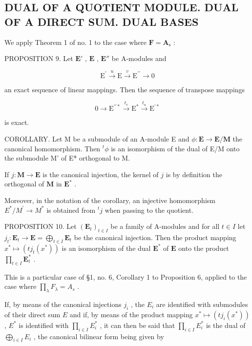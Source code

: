 \subsection{DUAL OF A QUOTIENT MODULE. DUAL OF A DIRECT SUM. DUAL BASES}

We apply Theorem 1 of no. 1 to the case where \(\mathbf{F} = \mathbf{A}_{\mathrm{s}}\) :

PROPOSITION 9. Let \(\mathbf{E}'\) , \(\mathbf{E}\) , \(\mathbf{E}''\) be A-modules and

\[
\mathrm{E} ^ {\prime} \stackrel {u} {\longrightarrow} \mathrm{E} \stackrel {v} {\longrightarrow} \mathrm{E} ^ {\prime \prime} \longrightarrow 0\tag{21}
\]

an exact sequence of linear mappings. Then the sequence of transpose mappings

\[
0 \longrightarrow \mathrm{E} ^ {\prime \prime *} \stackrel {t _ {v}} {\longrightarrow} \mathrm{E} ^ {*} \stackrel {t _ {u}} {\longrightarrow} \mathrm{E} ^ {\prime *} \tag {1}
\]

is exact.

COROLLARY. Let M be a submodule of an A-module E and \(\phi: \mathbf{E} \to \mathbf{E} / \mathbf{M}\) the canonical homomorphism. Then \(^t\phi\) is an isomorphism of the dual of E/M onto the submodule M' of E* orthogonal to M.

If \(j: \mathbf{M} \to \mathbf{E}\) is the canonical injection, the kernel of \(j\) is by definition the orthogonal of \(\mathbf{M}\) in \(\mathbf{E}^*\) .

Moreover, in the notation of the corollary, an injective homomorphism \(E^{*}/M^{\prime} \rightarrow M^{*}\) is obtained from \(^{t}j\) when passing to the quotient.

PROPOSITION 10. Let \((\mathbf{E}_t)_{t \in I}\) be a family of A-modules and for all \(t \in I\) let \(j_t: \mathbf{E}_t \to \mathbf{E} = \bigoplus_{t \in I} \mathbf{E}_t\) be the canonical injection. Then the product mapping \(x^* \mapsto (t j_t(x^*))\) is an isomorphism of the dual \(\mathbf{E}^*\) of \(\mathbf{E}\) onto the product \(\prod_{t \in I} \mathbf{E}_t^*\) .

This is a particular case of §1, no. 6, Corollary 1 to Proposition 6, applied to the case where \(\prod_{\lambda} F_{\lambda} = A_{s}\) .

If, by means of the canonical injections \(j_{i}\) , the \(E_{i}\) are identified with submodules of their direct sum \(E\) and if, by means of the product mapping \(x^{*} \mapsto (t j_{i}(x^{*}))\) , \(E^{*}\) is identified with \(\prod_{i \in I} E_{i}^{*}\) , it can then be said that \(\prod_{i \in I} E_{i}^{*}\) is the dual of \(\bigoplus_{i \in I} E_{i}\) , the canonical bilinear form being given by

